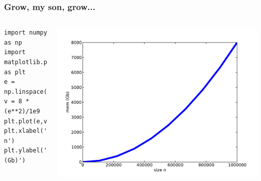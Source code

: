 \documentclass[10pt,colorlinks]{beamer}
\begin{document}
\begin{frame}[fragile]\frametitle{Grow, my son, grow...}
\begin{columns}[c]
\begin{verbatim}
import numpy as np
import matplotlib.pyplot as plt
e = np.linspace(0,1e6,10)
v = 8 * (e**2)/1e9
plt.plot(e,v,lw=5)
plt.xlabel('size n')
plt.ylabel('mem (Gb)')
\end{verbatim}

\includegraphics[width=\textwidth]{plwfigis/CursP_3_figure74}

\end{columns}
\end{frame}
\end{document}
